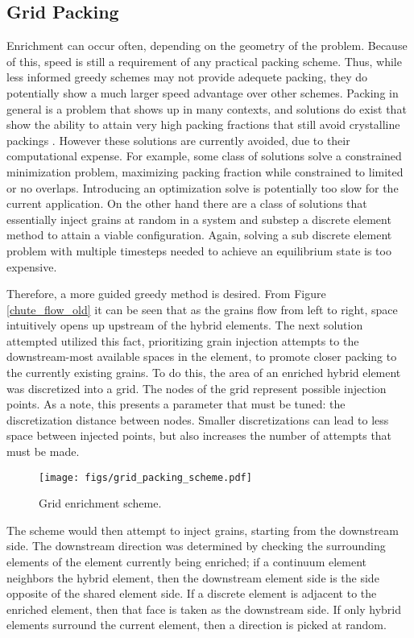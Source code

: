 \subsection{Grid Packing}
Enrichment can occur often, depending on the geometry of the problem. Because of this, speed is still a requirement of any practical packing scheme. Thus, while less informed greedy schemes may not provide adequete packing, they do potentially show a much larger speed advantage over other schemes. Packing in general is a problem that shows up in many contexts, and solutions do exist that show the ability to attain very high packing fractions that still avoid crystalline packings %
. However these solutions are currently avoided, due to their computational expense. For example, some class of solutions solve a constrained minimization problem, maximizing packing fraction while constrained to limited or no overlaps. Introducing an optimization solve is potentially too slow for the current application. On the other hand there are a class of solutions that essentially inject grains at random in a system and substep a discrete element method to attain a viable configuration. Again, solving a sub discrete element problem with multiple timesteps needed to achieve an equilibrium state is too expensive.

Therefore, a more guided greedy method is desired. From Figure \ref{chute_flow_old} it can be seen that as the grains flow from left to right, space intuitively opens up upstream of the hybrid elements. The next solution attempted utilized this fact, prioritizing grain injection attempts to the downstream-most available spaces in the element, to promote closer packing to the currently existing grains. To do this, the area of an enriched hybrid element was discretized into a grid. The nodes of the grid represent possible injection points. As a note, this presents a parameter that must be tuned: the discretization distance between nodes. Smaller discretizations can lead to less space between injected points, but also increases the number of attempts that must be made. 

\begin{figure}[htp] 
    \centering
    \texttt{[image: figs/grid\_packing\_scheme.pdf]}
    \caption{Grid enrichment scheme.}
    \label{grid_enrichment}
\end{figure}

The scheme would then attempt to inject grains, starting from the downstream side. The downstream direction was determined by checking the surrounding elements of the element currently being enriched; if a continuum element neighbors the hybrid element, then the downstream element side is the side opposite of the shared element side. If a discrete element is adjacent to the enriched element, then that face is taken as the downstream side. If only hybrid elements surround the current element, then a direction is picked at random. 

